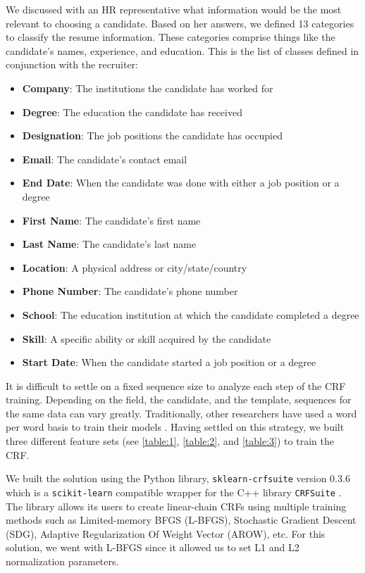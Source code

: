   We discussed with an HR representative what information would be the most
  relevant to choosing a candidate. Based on her answers, we defined 13
  categories to classify the resume information. These categories comprise
  things like the candidate's names, experience, and education. This is the
  list of classes defined in conjunction with the recruiter:
  \begin{itemize}
    \item \textbf{Company}: The institutions the candidate has worked for
    \item \textbf{Degree}: The education the candidate has received
    \item \textbf{Designation}: The job positions the candidate has occupied
    \item \textbf{Email}: The candidate's contact email
    \item \textbf{End Date}: When the candidate was done with either a job
      position or a degree
    \item \textbf{First Name}: The candidate's first name
    \item \textbf{Last Name}: The candidate's last name
    \item \textbf{Location}: A physical address or city/state/country
    \item \textbf{Phone Number}: The candidate's phone number
    \item \textbf{School}: The education institution at which the candidate
      completed a degree
    \item \textbf{Skill}: A specific ability or skill acquired by the candidate
    \item \textbf{Start Date}: When the candidate started a job position or a
      degree
  \end{itemize}

  It is difficult to settle on a fixed sequence size to analyze each step of
  the CRF training. Depending on the field, the candidate, and the template,
  sequences for the same data can vary greatly. Traditionally, other
  researchers have used a word per word basis to train their models
  \cite{Ayishathahira2018a,E*2020}. Having settled on this strategy, we
  built three different feature sets (see \ref{table:1}, \ref{table:2}, and
  \ref{table:3}) to train the CRF.

  We built the solution using the Python library, \texttt{sklearn-crfsuite}
  version 0.3.6 which is a \texttt{scikit-learn} compatible wrapper for the C++
  library \texttt{CRFSuite} \cite{CRFsuite}. The library allows its users to
  create linear-chain CRFs using multiple training methods such as
  Limited-memory BFGS (L-BFGS), Stochastic Gradient Descent (SDG), Adaptive
  Regularization Of Weight Vector (AROW), etc. For this solution, we went with
  L-BFGS since it allowed us to set L1 and L2 normalization parameters.

